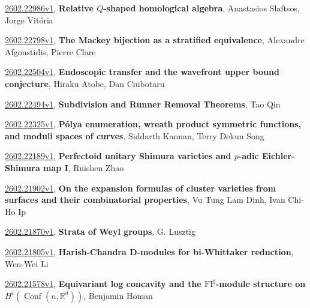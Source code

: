 \documentclass[9pt, a4paper]{article}
\theoremstyle{plain}
\theoremstyle{definition}
\theoremstyle{remark}
\newcommand{\arxiv}[3]{\href{https://arxiv.org/abs/#1}{#1}, \textbf{\textcolor{arxivblue}{#2}}, #3}
\begin{document}
\arxiv{2602.22986v1}{Relative $Q$-shaped homological algebra}{Anastasios Slaftsos, Jorge Vitória}

\arxiv{2602.22798v1}{The Mackey bijection as a stratified equivalence}{Alexandre Afgoustidis, Pierre Clare}

\arxiv{2602.22504v1}{Endoscopic transfer and the wavefront upper bound conjecture}{Hiraku Atobe, Dan Ciubotaru}

\arxiv{2602.22494v1}{Subdivision and Runner Removal Theorems}{Tao Qin}

\arxiv{2602.22325v1}{Pólya enumeration, wreath product symmetric functions, and moduli spaces of curves}{Siddarth Kannan, Terry Dekun Song}

\arxiv{2602.22189v1}{Perfectoid unitary Shimura varieties and $p$-adic Eichler-Shimura map I}{Ruishen Zhao}

\arxiv{2602.21902v1}{On the expansion formulas of cluster varieties from surfaces and their combinatorial properties}{Vu Tung Lam Dinh, Ivan Chi-Ho Ip}

\arxiv{2602.21870v1}{Strata of Weyl groups}{G. Lusztig}

\arxiv{2602.21805v1}{Harish-Chandra D-modules for bi-Whittaker reduction}{Wen-Wei Li}

\arxiv{2602.21578v1}{Equivariant log concavity and the $\operatorname{FI^\sharp}$-module structure on $H^i(\operatorname{Conf}(n,\mathbb{R}^d))$}{Benjamin Homan}

\end{document}

